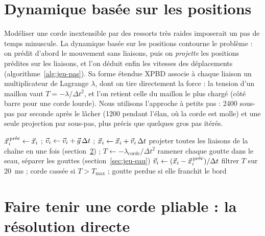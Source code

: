 \section{Dynamique basée sur les positions}

Modéliser une corde inextensible par des ressorts très raides imposerait un pas
de temps minuscule. La dynamique basée sur les positions \parencite{muller2007pbd}
contourne le problème : on prédit d'abord le mouvement sans liaisons, puis on
\emph{projette} les positions prédites sur les liaisons, et l'on déduit enfin les
vitesses des déplacements (algorithme~\ref{alg:jeu-pas}). Sa forme étendue XPBD
\parencite{macklin2016xpbd} associe à chaque liaison un multiplicateur de Lagrange
\(\lambda\), dont on tire directement la force : la tension d'un maillon vaut
\(T = -\lambda/\Delta t^2\), et l'on retient celle du maillon le plus chargé (côté barre
pour une corde lourde). Nous utilisons l'approche à petits pas
\parencite{macklin2019smallsteps} : \num{2400} sous-pas par seconde après le lâcher
(\num{1200} pendant l'élan, où la corde est molle) et une seule projection par
sous-pas, plus précis que quelques gros pas itérés.

\begin{algorithm}[ht]
  \caption{Un sous-pas de la simulation du seau (\(\Delta t = 1/2400\) s).}
  \label{alg:jeu-pas}
  \begin{algorithmic}[1]
      \State \(\vec{x}^{\,\text{préc}}_i \gets \vec{x}_i\) ;\quad
             \(\vec{v}_i \gets \vec{v}_i + \vec{g} \, \Delta t\) ;\quad
             \(\vec{x}_i \gets \vec{x}_i + \vec{v}_i \, \Delta t\)
    \EndFor
    \State projeter toutes les liaisons de la chaîne en une fois (section~\ref{sec:jeu-direct}) ; \(T \gets -\lambda_{\text{corde}}/\Delta t^2\)
    \State ramener chaque goutte dans le seau, séparer les gouttes (section~\ref{sec:jeu-eau})
      \State \(\vec{v}_i \gets (\vec{x}_i - \vec{x}^{\,\text{préc}}_i)/\Delta t\)
    \EndFor
    \State filtrer \(T\) sur \SI{20}{ms} ; corde cassée si \(T > T_{\max}\) ; goutte perdue si elle franchit le bord
  \end{algorithmic}
\end{algorithm}

\section{Faire tenir une corde pliable : la résolution directe}
\label{sec:jeu-direct}

